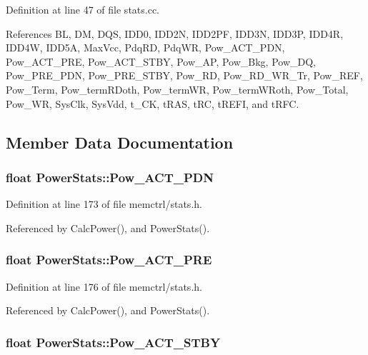 Definition at line 47 of file stats.cc.

References BL, DM, DQS, IDD0, IDD2N, IDD2PF, IDD3N, IDD3P, IDD4R, IDD4W, IDD5A, MaxVcc, PdqRD, PdqWR, Pow\_\-ACT\_\-PDN, Pow\_\-ACT\_\-PRE, Pow\_\-ACT\_\-STBY, Pow\_\-AP, Pow\_\-Bkg, Pow\_\-DQ, Pow\_\-PRE\_\-PDN, Pow\_\-PRE\_\-STBY, Pow\_\-RD, Pow\_\-RD\_\-WR\_\-Tr, Pow\_\-REF, Pow\_\-Term, Pow\_\-termRDoth, Pow\_\-termWR, Pow\_\-termWRoth, Pow\_\-Total, Pow\_\-WR, SysClk, SysVdd, t\_\-CK, tRAS, tRC, tREFI, and tRFC.

\subsection{Member Data Documentation}
\subsubsection[{Pow\_\-ACT\_\-PDN}]{\setlength{\rightskip}{0pt plus 5cm}float {\bf PowerStats::Pow\_\-ACT\_\-PDN}}\label{classPowerStats_a54e530f27e6de3a9413806c01265082}




Definition at line 173 of file memctrl/stats.h.

Referenced by CalcPower(), and PowerStats().
\subsubsection[{Pow\_\-ACT\_\-PRE}]{\setlength{\rightskip}{0pt plus 5cm}float {\bf PowerStats::Pow\_\-ACT\_\-PRE}}\label{classPowerStats_26d3a59564a00ba326b52e7339532c1e}




Definition at line 176 of file memctrl/stats.h.

Referenced by CalcPower(), and PowerStats().
\subsubsection[{Pow\_\-ACT\_\-STBY}]{\setlength{\rightskip}{0pt plus 5cm}float {\bf PowerStats::Pow\_\-ACT\_\-STBY}}\label{classPowerStats_934def72d9c17387227f03aa77cf33f1}




